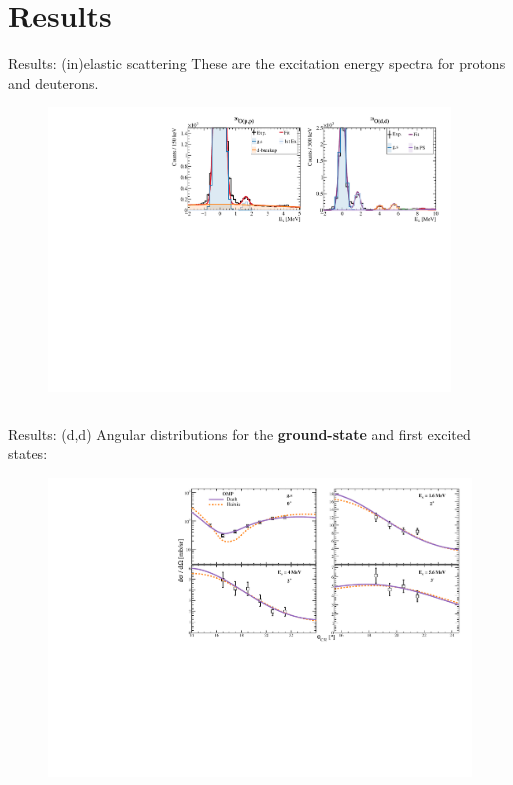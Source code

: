 \documentclass[aspectratio=43, dvipsnames]{beamer}
\newcommand{\iso}[2]{\ce{^{#1}#2}}
\begin{document}
\section{Results}
\begin{frame}{Results: (in)elastic scattering}
	These are the excitation energy spectra for protons and deuterons.
	\begin{figure}
		\includegraphics[width=0.95\textwidth]{figures/elastic_xz.pdf}
	\end{figure}
	\begin{columns}[c]
		\begin{column}{0.45\linewidth}
		\end{column}%
		\begin{column}{0.45\linewidth}
		\end{column}
	\end{columns}
\end{frame}

\begin{frame}{Results: \iso{20}{O}(d,d)}
	Angular distributions for the \textbf{ground-state} and first excited states:
	\begin{figure}
		\includegraphics[width=0.85\linewidth]{figures/d_ang.pdf}
	\end{figure}
\end{frame}
\end{document}
